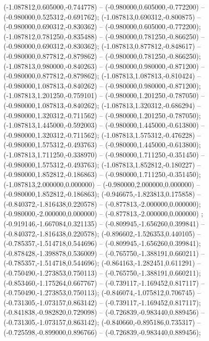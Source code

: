  (-1.087812,0.605000,-0.744778) -- (-0.980000,0.605000,-0.772200) -- (-0.980000,0.525312,-0.691762);
 (-1.087813,0.690312,-0.800875) -- (-0.980000,0.690312,-0.830362) -- (-0.980000,0.605000,-0.772200);
 (-1.087812,0.781250,-0.835488) -- (-0.980000,0.781250,-0.866250) -- (-0.980000,0.690312,-0.830362);
 (-1.087813,0.877812,-0.848617) -- (-0.980000,0.877812,-0.879862) -- (-0.980000,0.781250,-0.866250);
 (-1.087813,0.980000,-0.840263) -- (-0.980000,0.980000,-0.871200) -- (-0.980000,0.877812,-0.879862);
 (-1.087813,1.087813,-0.810424) -- (-0.980000,1.087813,-0.840262) -- (-0.980000,0.980000,-0.871200);
 (-1.087813,1.201250,-0.759101) -- (-0.980000,1.201250,-0.787050) -- (-0.980000,1.087813,-0.840262);
 (-1.087813,1.320312,-0.686294) -- (-0.980000,1.320312,-0.711562) -- (-0.980000,1.201250,-0.787050);
 (-1.087813,1.445000,-0.592003) -- (-0.980000,1.445000,-0.613800) -- (-0.980000,1.320312,-0.711562);
 (-1.087813,1.575312,-0.476228) -- (-0.980000,1.575312,-0.493763) -- (-0.980000,1.445000,-0.613800);
 (-1.087813,1.711250,-0.338970) -- (-0.980000,1.711250,-0.351450) -- (-0.980000,1.575312,-0.493763);
 (-1.087813,1.852812,-0.180227) -- (-0.980000,1.852812,-0.186863) -- (-0.980000,1.711250,-0.351450);
 (-1.087813,2.000000,0.000000) -- (-0.980000,2.000000,0.000000) -- (-0.980000,1.852812,-0.186863);
 (-0.946675,-1.823813,0.175858) -- (-0.840372,-1.816438,0.220578) -- (-0.877813,-2.000000,0.000000);
 (-0.980000,-2.000000,0.000000) -- (-0.877813,-2.000000,0.000000) ;
 (-0.919146,-1.667084,0.321135) -- (-0.809945,-1.656260,0.399841) -- (-0.840372,-1.816438,0.220578);
 (-0.896602,-1.526353,0.440105) -- (-0.785357,-1.514718,0.544696) -- (-0.809945,-1.656260,0.399841);
 (-0.878428,-1.398878,0.536009) -- (-0.765750,-1.388191,0.660211) -- (-0.785357,-1.514718,0.544696);
 (-0.864163,-1.282451,0.611291) -- (-0.750490,-1.273853,0.750113) -- (-0.765750,-1.388191,0.660211);
 (-0.853460,-1.175264,0.667767) -- (-0.739117,-1.169452,0.817117) -- (-0.750490,-1.273853,0.750113);
 (-0.846074,-1.075812,0.706745) -- (-0.731305,-1.073157,0.863142) -- (-0.739117,-1.169452,0.817117);
 (-0.841838,-0.982820,0.729098) -- (-0.726839,-0.983440,0.889456) -- (-0.731305,-1.073157,0.863142);
 (-0.840660,-0.895186,0.735317) -- (-0.725598,-0.899000,0.896766) -- (-0.726839,-0.983440,0.889456);
